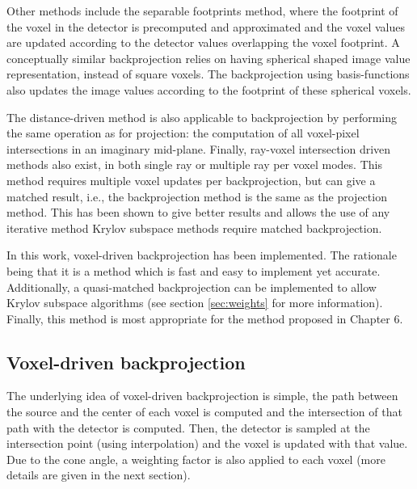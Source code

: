 Other methods include the separable footprints method\cite{long20103d}, where the footprint of the voxel in the detector is precomputed and approximated and the voxel values are updated according to the detector values overlapping the voxel footprint. A conceptually similar backprojection relies on having spherical shaped image value representation, instead of square voxels\cite{spherical}. The backprojection using basis-functions also updates the image values according to the footprint of these spherical voxels.
 
The distance-driven method\cite{schlifske2016fast} is also applicable to backprojection by performing the same operation as for projection: the computation of all voxel-pixel intersections in an imaginary mid-plane. Finally, ray-voxel intersection driven methods also exist\cite{park2015fully}, in both single ray or multiple ray per voxel modes. This method requires multiple voxel updates per backprojection, but can give a matched result, i.e., the backprojection method is the same as the projection method. This has been shown to give better results\cite{6829349} and allows the use of any iterative method Krylov subspace methods require matched backprojection. 
 
In this work, voxel-driven backprojection has been implemented. The rationale being that it is a method which is fast and easy to implement yet accurate. Additionally, a quasi-matched backprojection can be implemented to allow Krylov subspace algorithms (see section \ref{sec:weights} for more information). Finally, this method is most appropriate for the method proposed in Chapter 6.
 

\subsection{Voxel-driven backprojection}

The underlying idea of voxel-driven backprojection is simple, the path between the source and the center of each voxel is computed and the intersection of that path with the detector is computed. Then, the detector is sampled at the intersection point (using interpolation) and the voxel is updated with that value. Due to the cone angle, a weighting factor is also applied to each voxel (more details are given in the next section).


